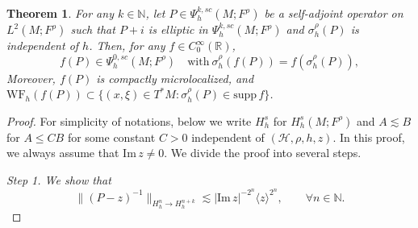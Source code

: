 \documentclass[10pt,a4paper]{amsart}
\newtheorem{theorem}{Theorem}
\newcommand\N{\ensuremath{\mathbb{N}}}
\newcommand\R{\ensuremath{\mathbb{R}}}
\begin{document}
\begin{theorem}\label{mainthmofquantized}
For any $k \in \mathbb{N}$, let $P\in \Psi^{k,sc}_h(M;F^\rho)$ be a self-adjoint operator on $L^2(M;F^{\rho})$ such that $P+i$ is elliptic in $\Psi^{k,sc}_h(M;F^\rho)$ and $\sigma_{h}^{\rho}(P)$ is independent of $h$. Then, for any $f\in C_{0}^{\infty}(\R)$, 
\begin{equation}
f(P) \in \Psi^{0,sc}_{h}(M;F^\rho) \quad \mathrm{with} \ \sigma_{h}^{\rho}(f(P))=f(\sigma_{h}^{\rho}(P)),
\end{equation}
Moreover, $f(P)$ is compactly microlocalized, and $\mathrm{WF}_{h}(f(P))\subset \{(x,\xi)\in T^*M: \sigma^\rho_{h}(P) \in \mathrm{supp}\,f\}$.
\end{theorem}

\begin{proof}
For simplicity of notations, below we write $H^s_h$ for $H^s_h(M;F^\rho)$ and $A\lesssim B$ for $A\leq CB$ for some constant $C>0$ independent of $(\mathcal{H},\rho,h,z)$. In this proof, we always assume that $\mathrm{Im} \, z \neq 0$. We divide the proof into several steps.

\emph{Step 1. We show that}
\begin{equation}\label{sobolevnormofresolvent}
\|(P-z)^{-1}\|_{H^{n}_h\to H^{n+k}_{h}}\lesssim |\mathrm{Im} \, z|^{-2^n} \langle z\rangle^{2^n}
 , \qquad \forall n\in \N.
\end{equation}


\end{proof}
\end{document}
